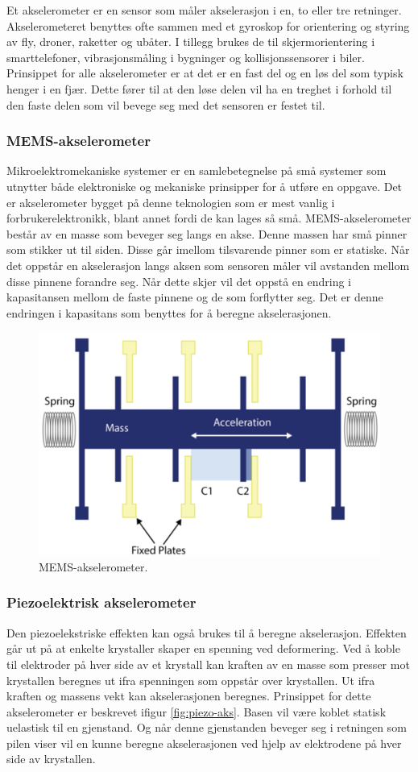 Et akselerometer er en sensor som måler akselerasjon i en, to eller tre retninger. 
Akselerometeret benyttes ofte sammen med et gyroskop for orientering og styring av fly, droner, 
raketter og ubåter. I tillegg brukes de til skjermorientering i smarttelefoner, 
vibrasjonsmåling i bygninger og kollisjonssensorer i biler. \parencite{Balchen2000}
Prinsippet for alle akselerometer er at det er en fast del og en løs del som typisk henger i en fjær. 
Dette fører til at den løse delen vil ha en treghet i forhold til den faste delen som 
vil bevege seg med det sensoren er festet til. \parencite{Balchen2000}

\subsubsection{MEMS-akselerometer}
Mikroelektromekaniske systemer er en samlebetegnelse på små systemer som utnytter både elektroniske og 
mekaniske prinsipper for å utføre en oppgave. Det er akselerometer bygget på denne teknologien som er 
mest vanlig i forbrukerelektronikk, blant annet fordi de kan lages så små. MEMS-akselerometer består av 
en masse som beveger seg langs en akse. Denne massen har små pinner som stikker ut til siden. 
Disse går imellom tilsvarende pinner som er statiske. Når det oppstår en akselerasjon langs aksen som 
sensoren måler vil avstanden mellom disse pinnene forandre seg. Når dette skjer vil det oppstå en endring 
i kapasitansen mellom de faste pinnene og de som forflytter seg. 
Det er denne endringen i kapasitans som benyttes for å beregne akselerasjonen. 

\begin{figure}[htp]
    \centering
    \includegraphics[width=0.5\columnwidth]{figures/mems-aks}
    \caption{MEMS-akselerometer. \parencite{LevelDevelopments2020}}
    \label{fig:mems-aks}
\end{figure}

\subsubsection{Piezoelektrisk akselerometer}
Den piezoelekstriske effekten kan også brukes til å beregne akselerasjon. 
Effekten går ut på at enkelte krystaller skaper en spenning ved deformering. \parencite{Gron2021piezo}
Ved å koble til elektroder på hver side av et krystall kan kraften av en masse som presser mot 
krystallen beregnes ut ifra spenningen som oppstår over krystallen. Ut ifra kraften og massens 
vekt kan akselerasjonen beregnes. Prinsippet for dette akselerometer er beskrevet ifigur \ref{fig:piezo-aks}. 
Basen vil være koblet statisk uelastisk til en gjenstand. Og når denne gjenstanden beveger seg i retningen som 
pilen viser vil en kunne beregne akselerasjonen ved hjelp av elektrodene på hver side av krystallen. 

